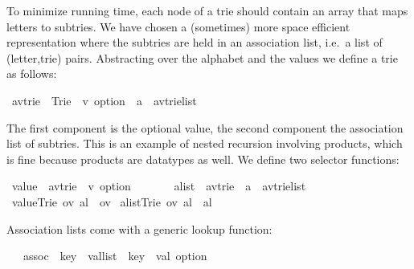 %
\begin{isabellebody}%
\def\isabellecontext{Trie}%
%
\begin{isamarkuptext}%
To minimize running time, each node of a trie should contain an array that maps
letters to subtries. We have chosen a (sometimes) more space efficient
representation where the subtries are held in an association list, i.e.\ a
list of (letter,trie) pairs.  Abstracting over the alphabet  and the
values  we define a trie as follows:%
\end{isamarkuptext}%
\ {\isacharparenleft}{\isacharprime}a{\isacharcomma}{\isacharprime}v{\isacharparenright}trie\ {\isacharequal}\ Trie\ \ {\isachardoublequote}{\isacharprime}v\ option{\isachardoublequote}\ \ {\isachardoublequote}{\isacharparenleft}{\isacharprime}a\ {\isacharasterisk}\ {\isacharparenleft}{\isacharprime}a{\isacharcomma}{\isacharprime}v{\isacharparenright}trie{\isacharparenright}list{\isachardoublequote}%
\begin{isamarkuptext}%
\noindent
The first component is the optional value, the second component the
association list of subtries.  This is an example of nested recursion involving products,
which is fine because products are datatypes as well.
We define two selector functions:%
\end{isamarkuptext}%
\ value\ {\isacharcolon}{\isacharcolon}\ {\isachardoublequote}{\isacharparenleft}{\isacharprime}a{\isacharcomma}{\isacharprime}v{\isacharparenright}trie\ {\isasymRightarrow}\ {\isacharprime}v\ option{\isachardoublequote}\isanewline
\ \ \ \ \ \ \ alist\ {\isacharcolon}{\isacharcolon}\ {\isachardoublequote}{\isacharparenleft}{\isacharprime}a{\isacharcomma}{\isacharprime}v{\isacharparenright}trie\ {\isasymRightarrow}\ {\isacharparenleft}{\isacharprime}a\ {\isacharasterisk}\ {\isacharparenleft}{\isacharprime}a{\isacharcomma}{\isacharprime}v{\isacharparenright}trie{\isacharparenright}list{\isachardoublequote}\isanewline
{}\ {\isachardoublequote}value{\isacharparenleft}Trie\ ov\ al{\isacharparenright}\ {\isacharequal}\ ov{\isachardoublequote}\isanewline
{}\ {\isachardoublequote}alist{\isacharparenleft}Trie\ ov\ al{\isacharparenright}\ {\isacharequal}\ al{\isachardoublequote}%
\begin{isamarkuptext}%
\noindent
Association lists come with a generic lookup function:%
\end{isamarkuptext}%
\ \ \ assoc\ {\isacharcolon}{\isacharcolon}\ {\isachardoublequote}{\isacharparenleft}{\isacharprime}key\ {\isacharasterisk}\ {\isacharprime}val{\isacharparenright}list\ {\isasymRightarrow}\ {\isacharprime}key\ {\isasymRightarrow}\ {\isacharprime}val\ option{\isachardoublequote}\isanewline

\end{isabellebody}
